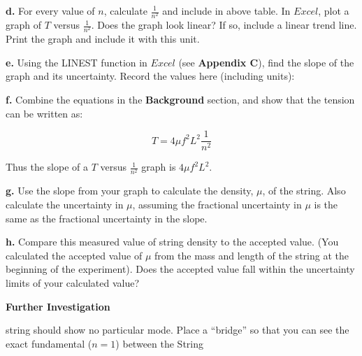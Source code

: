 \textbf{d. } For every value of $n$, calculate $\frac{1}{n^2}$ and include in above table. In $Excel$, plot a graph of $T$ versus $\frac{1}{n^2}$.
Does the graph look linear? If so, include a linear trend line. Print the graph and include it with this unit.
\vspace{20mm}

\textbf{e. } Using the LINEST function in $Excel$ (see \textbf{Appendix C}), find the slope of the graph and its uncertainty. Record the values here
(including units):

\vspace{20mm}

\textbf{f. } Combine the equations in the \textbf{Background } section, and show that the tension can be written as:

\begin{equation}
T=4\mu f^{2}L^{2}\frac{1}{n^2}
\end{equation}

\vspace{25mm}

Thus the slope of a $T$ versus $\frac{1}{n^2}$ graph is $4\mu f^{2}L^{2}$.

\textbf{g. } Use the slope from your graph to calculate the density, $\mu $, of the string. Also calculate the uncertainty in $\mu$, assuming the
fractional uncertainty in $\mu$ is the same as the fractional uncertainty in the slope.

\vspace{5cm}

\textbf{h. } Compare this measured value of string density to the accepted value. (You calculated the accepted value of $\mu $ from the mass and
length of the string at the beginning of the experiment). Does the accepted value fall within the uncertainty limits of your calculated value?

\vspace{50mm}




\textbf{Further Investigation}

string should show no particular mode. Place a ``bridge'' so that you can see the exact fundamental ($n = 1$) between the String

